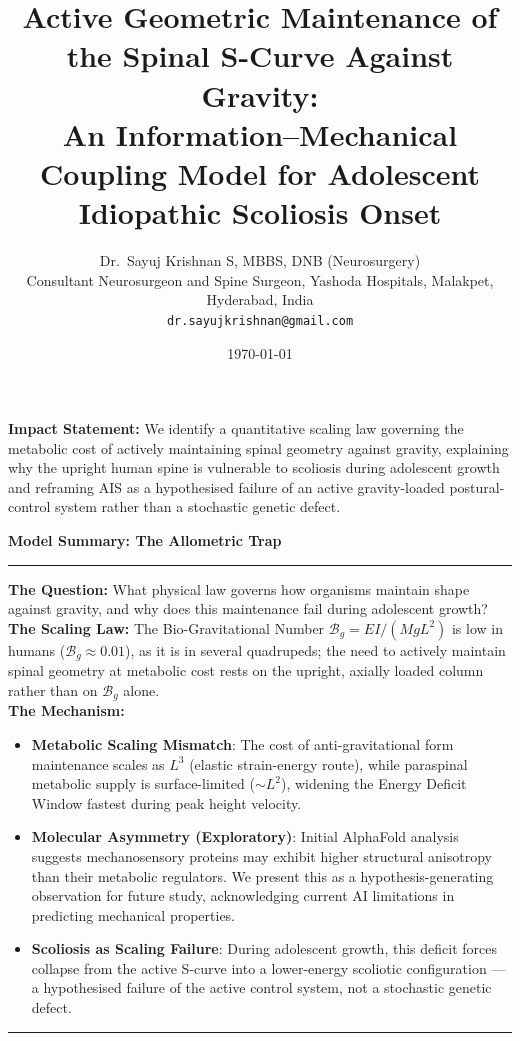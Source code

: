 \documentclass[11pt,a4paper]{article}
\title{Active Geometric Maintenance of the Spinal S-Curve Against Gravity:\\ An Information--Mechanical Coupling Model for Adolescent Idiopathic Scoliosis Onset}
\author{Dr.~Sayuj Krishnan S, MBBS, DNB (Neurosurgery)\\
Consultant Neurosurgeon and Spine Surgeon, Yashoda Hospitals, Malakpet, Hyderabad, India\\
\texttt{dr.sayujkrishnan@gmail.com}
}
\date{\today}
\newenvironment{mathbox}[1][]
 {\par\vspace{\baselineskip}\noindent\textbf{#1}\par\noindent\rule{\textwidth}{0.4pt}\par\noindent}
 {\par\noindent\rule{\textwidth}{0.4pt}\vspace{\baselineskip}\par}
\begin{document}
\linenumbers
\maketitle



\vspace{0.5em}
\noindent\textbf{Impact Statement:} We identify a quantitative scaling law governing the metabolic cost of actively maintaining spinal geometry against gravity, explaining why the upright human spine is vulnerable to scoliosis during adolescent growth and reframing AIS as a hypothesised failure of an active gravity-loaded postural-control system rather than a stochastic genetic defect.
\vspace{0.5em}

\begin{mathbox}[Model Summary: The Allometric Trap]
\textbf{The Question:} What physical law governs how organisms maintain shape against gravity, and why does this maintenance fail during adolescent growth?\\[4pt]
\textbf{The Scaling Law:} The Bio-Gravitational Number $\mathcal{B}_g = EI/(MgL^2)$ is low in humans ($\mathcal{B}_g \approx 0.01$), as it is in several quadrupeds; the need to actively maintain spinal geometry at metabolic cost rests on the upright, axially loaded column rather than on $\mathcal{B}_g$ alone.\\[4pt]
\textbf{The Mechanism:}
\begin{itemize}
    \item \textbf{Metabolic Scaling Mismatch}: The cost of anti-gravitational form maintenance scales as $L^3$ (elastic strain-energy route), while paraspinal metabolic supply is surface-limited ($\sim L^2$), widening the Energy Deficit Window fastest during peak height velocity.
    \item \textbf{Molecular Asymmetry (Exploratory)}: Initial AlphaFold analysis suggests mechanosensory proteins may exhibit higher structural anisotropy than their metabolic regulators. We present this as a hypothesis-generating observation for future study, acknowledging current AI limitations in predicting mechanical properties.
    \item \textbf{Scoliosis as Scaling Failure}: During adolescent growth, this deficit forces collapse from the active S-curve into a lower-energy scoliotic configuration --- a hypothesised failure of the active control system, not a stochastic genetic defect.
\end{itemize}
\end{mathbox}
\end{document}

